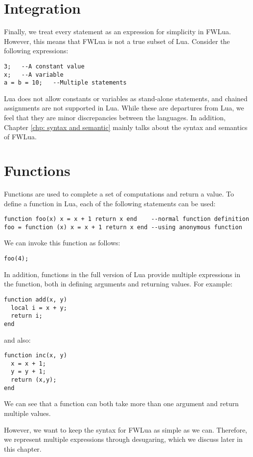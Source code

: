 \section{Integration}
Finally, we treat every statement as an expression for simplicity in FWLua.
However, this means that FWLua is not a true subset of Lua.
Consider the following expressions:

\begin{verbatim}
3;   --A constant value
x;   --A variable
a = b = 10;   --Multiple statements
\end{verbatim}

Lua does not allow constants or variables as stand-alone statements,
and chained assignments are not supported in Lua.
While these are departures from Lua, we feel that they are minor discrepancies between the languages. In addition, Chapter \ref{chp: syntax and semantic} mainly talks about the syntax and semantics of FWLua.



\section{Functions}
Functions are used to complete a set of computations and return a value.
To define a function in Lua, each of the following statements can be used:
\begin{verbatim}
function foo(x) x = x + 1 return x end    --normal function definition
foo = function (x) x = x + 1 return x end --using anonymous function
\end{verbatim}
We can invoke this function as follows:
\begin{verbatim}
foo(4);
\end{verbatim}
In addition, functions in the full version of Lua provide multiple expressions in the function, both in defining arguments and returning values. For example:
\begin{verbatim}
function add(x, y)
  local i = x + y;
  return i;
end
\end{verbatim}
and also:
\begin{verbatim}
function inc(x, y)
  x = x + 1;
  y = y + 1;
  return (x,y);
end
\end{verbatim}
We can see that a function can both take more than one argument and return multiple values.

However, we want to keep the syntax for FWLua as simple as we can. Therefore, we represent multiple expressions through desugaring, which we discuss later in this chapter.

